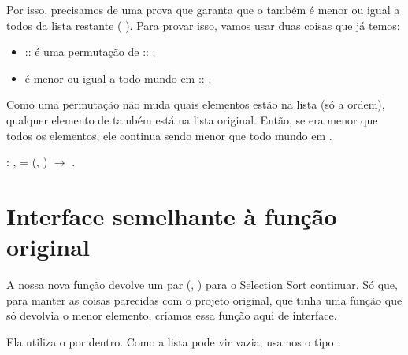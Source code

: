     Por isso, precisamos de uma prova que garanta que o  também é menor ou igual a todos da lista restante  (  ).
    Para provar isso, vamos usar duas coisas que já temos:

\begin{itemize}
\item  {} ::  é uma permutação de  :: ;

\item  {} é menor ou igual a todo mundo em  :: .

\end{itemize}
    Como uma permutação não muda quais elementos estão na lista (só a ordem), qualquer elemento de  também está na lista original. Então, se  era menor que todos os elementos, ele continua sendo menor que todo mundo em .
\begin{coqdoccode}
\coqdocemptyline
\coqdocnoindent
{}  :\coqdoceol
\coqdocindent{1.00em}
\coqdockw{\ensuremath{\forall}}    ,\coqdoceol
\coqdocindent{2.00em}
   = (, ) \ensuremath{\rightarrow}\coqdoceol
\coqdocindent{2.00em}
  .\coqdoceol
\coqdocemptyline
\end{coqdoccode}
\section{Interface semelhante à função original \texorpdfstring{\protect{}}{select\_min}}




    A nossa nova função  devolve um par (, ) para o Selection Sort continuar.
    Só que, para manter as coisas parecidas com o projeto original, que tinha uma função  que só devolvia o menor elemento, criamos essa função aqui de interface.


    Ela utiliza o  por dentro.
    Como a lista pode vir vazia, usamos o tipo  :

